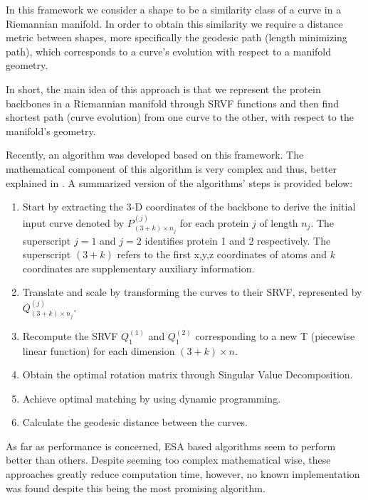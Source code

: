 In this framework we consider a shape to be a similarity class of a curve in a Riemannian manifold. In order to obtain this similarity we require a distance metric between shapes, more specifically the geodesic path (length minimizing path), which corresponds to a curve's evolution with respect to a manifold geometry.

In short, the main idea of this approach is that we represent the protein backbones in a Riemannian manifold through SRVF functions and then find shortest path (curve evolution) from one curve to the other, with respect to the manifold's geometry.

Recently, an algorithm was developed based on this framework. The mathematical component of this algorithm is very complex and thus, better explained in \cite{srivastava2016efficient}. A summarized version of the algorithms' steps is provided below:
\begin{enumerate}
	\item Start by extracting the 3-D coordinates of the backbone to derive the initial input curve denoted by $P_{(3+k)\times n_j}^{(j)}$ for each protein $j$ of length $n_j$. The superscript $j = 1$ and $j = 2$ identifies protein 1 and 2 respectively. The superscript $(3+k)$ refers to the first x,y,z coordinates of atoms and $k$ coordinates are supplementary auxiliary information.
	
	\item Translate and scale by transforming the curves to their SRVF, represented by $Q_{(3+k)\times n_j}^{
		(j)}$.
	
	\item Recompute the SRVF $Q_1^{(1)}$ and $Q_1^{(2)}$ corresponding to a new T (piecewise linear function) for each dimension $(3+k) \times n$.
	
	\item Obtain the optimal rotation matrix through Singular Value Decomposition.
	
	\item Achieve optimal matching by using dynamic programming.
	
	\item Calculate the geodesic distance between the curves.
\end{enumerate}

As far as performance is concerned, ESA based algorithms seem to perform better than others. Despite seeming too complex mathematical wise, these approaches greatly reduce computation time, however, no known implementation was found despite this being the most promising algorithm.

